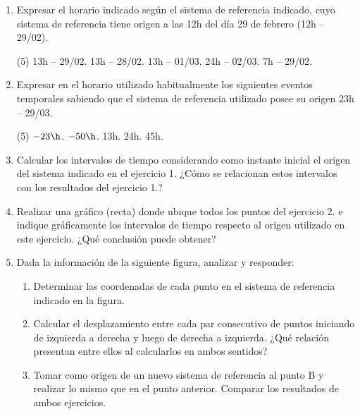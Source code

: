 
\begin{enumerate}
  \item Expresar el horario indicado según el sistema de referencia indicado,
    cuyo sistema de referencia tiene origen a las 12h del día 29 de febrero (12h
    -- 29/02).
    \begin{tasks}(5)
      \task 13h -- 29/02.
      \task 13h -- 28/02.
      \task 13h -- 01/03.
      \task 24h -- 02/03.
      \task 7h -- 29/02.
    \end{tasks}

  \item Expresar en el horario utilizado habitualmente los siguientes eventos
    temporales sabiendo que el sistema de referencia utilizado posee su origen
    23h -- 29/03.
    \begin{tasks}(5)
      \task $-23\h$.
      \task $-50\h$.
      \task 13h.
      \task 24h.
      \task 45h.
    \end{tasks}

  \item Calcular los intervalos de tiempo considerando como instante inicial el
    origen del sistema indicado en el ejercicio 1. ¿Cómo se relacionan estos
    intervalos con los resultados del ejercicio 1.?

  \item Realizar una gráfico (recta) donde ubique todos los puntos del ejercicio
    2. e indique gráficamente los intervalos de tiempo respecto al origen
    utilizado en este ejercicio. ¿Qué conclusión puede obtener?

  \item Dada la información de la siguiente figura, analizar y responder:
    \begin{figure}[!ht]
      
    \end{figure}
  
    \begin{enumerate}
      \item Determinar las coordenadas de cada punto en el sistema de referencia
	indicado en la figura.
      \item Calcular el desplazamiento entre cada par consecutivo de puntos
	iniciando de izquierda a derecha y luego de derecha a izquierda. ¿Qué
	relación presentan entre ellos al calcularlos en ambos sentidos?
      \item Tomar como origen de un nuevo sistema de referencia al punto B y
	realizar lo mismo que en el punto anterior. Comparar los resultados de
	ambos ejercicios.
    \end{enumerate}


\end{enumerate}
